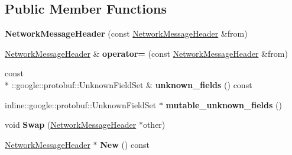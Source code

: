 \subsection*{Public Member Functions}
\begin{DoxyCompactItemize}
\item 
\hypertarget{classSimpleChat_1_1NetworkMessageHeader_a1d1af8dfcf0c03757ac9caf3d164b0e8}{{\bfseries Network\-Message\-Header} (const \hyperlink{classSimpleChat_1_1NetworkMessageHeader}{Network\-Message\-Header} \&from)}\label{classSimpleChat_1_1NetworkMessageHeader_a1d1af8dfcf0c03757ac9caf3d164b0e8}

\item 
\hypertarget{classSimpleChat_1_1NetworkMessageHeader_a2e9fe30dac33dfac80ac154ddcd0914a}{\hyperlink{classSimpleChat_1_1NetworkMessageHeader}{Network\-Message\-Header} \& {\bfseries operator=} (const \hyperlink{classSimpleChat_1_1NetworkMessageHeader}{Network\-Message\-Header} \&from)}\label{classSimpleChat_1_1NetworkMessageHeader_a2e9fe30dac33dfac80ac154ddcd0914a}

\item 
\hypertarget{classSimpleChat_1_1NetworkMessageHeader_a0d7814ba533eae44c26f024d84103e94}{const \\*
\-::google\-::protobuf\-::\-Unknown\-Field\-Set \& {\bfseries unknown\-\_\-fields} () const }\label{classSimpleChat_1_1NetworkMessageHeader_a0d7814ba533eae44c26f024d84103e94}

\item 
\hypertarget{classSimpleChat_1_1NetworkMessageHeader_a3e1df7d2aa1262ef8e17e2f5fdad7d40}{inline\-::google\-::protobuf\-::\-Unknown\-Field\-Set $\ast$ {\bfseries mutable\-\_\-unknown\-\_\-fields} ()}\label{classSimpleChat_1_1NetworkMessageHeader_a3e1df7d2aa1262ef8e17e2f5fdad7d40}

\item 
\hypertarget{classSimpleChat_1_1NetworkMessageHeader_ac12a19d7792504929483161b3489106d}{void {\bfseries Swap} (\hyperlink{classSimpleChat_1_1NetworkMessageHeader}{Network\-Message\-Header} $\ast$other)}\label{classSimpleChat_1_1NetworkMessageHeader_ac12a19d7792504929483161b3489106d}

\item 
\hypertarget{classSimpleChat_1_1NetworkMessageHeader_a6ceb4050a7cd60080404951418794879}{\hyperlink{classSimpleChat_1_1NetworkMessageHeader}{Network\-Message\-Header} $\ast$ {\bfseries New} () const }\label{classSimpleChat_1_1NetworkMessageHeader_a6ceb4050a7cd60080404951418794879}


\end{DoxyCompactItemize}
